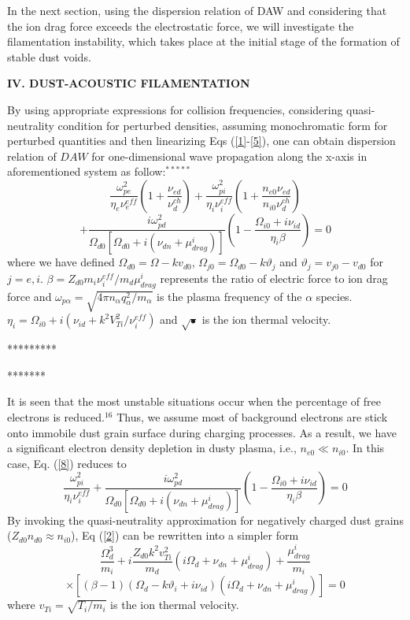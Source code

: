 In the next section, using the dispersion relation of DAW and
considering that the ion drag force exceeds the electrostatic force,
we will investigate the filamentation instability, which takes place
at the initial stage of the formation of stable dust voids.

\vskip 1cm {\bf\large IV. DUST-ACOUSTIC FILAMENTATION }\vskip 0.5cm

By using appropriate expressions for collision frequencies,
considering quasi-neutrality condition for perturbed densities,
assuming monochromatic form for perturbed quantities and  then
linearizing Eqs (\ref{1}-\ref{5}), one can obtain dispersion
relation of $DAW$ for one-dimensional wave propagation along the
x-axis in aforementioned system as follow:$^{*****}$
$$\frac{\omega_{pe}^2}{\eta_{e}\nu_{e}^{eff}}\left( 1+\frac{\nu_{ed}}{\nu_{d}^{ch}}\right)
 +\frac{\omega_{pi}^2}{\eta_{i}\nu_{i}^{eff}}\left( 1+\frac{n_{e0}\nu_{ed}}{n_{i0}\nu_{d}^{ch}}\right)$$
\begin{equation}\label{8}
+\frac{i\omega_{pd}^{2}}{\Omega_{d0}[\Omega_{d0}+i(\nu_{dn}+\mu_{drag}^i)]}\left( 1-\frac{\Omega_{i0}+
i\nu_{id}}{\eta_{i}\beta}\right) =0
\end{equation}
where we have defined $\Omega_{d0}=\Omega-k v_{d0}$,
$\Omega_{j0}=\Omega_{d0}-k\vartheta_{j}$ and
$\vartheta_{j}=v_{j0}-v_{d0}$ for $j = e, i$.
$\beta=Z_{d0}m_{i}\nu_{i}^{eff}/m_{d}\mu_{drag}^{i}$ represents the
ratio of electric force to ion drag force and
$\omega_{p\alpha}=\sqrt{4\pi n_{\alpha}q_{\alpha}^2/m_{\alpha}}$ is
the plasma frequency of the $\alpha$ species.
$\eta_{i}=\Omega_{i0}+i\left(\nu_{id}+k^2V_{Ti}^{2}/\nu_{i}^{eff}\right)$
and $\sqrt{•}$ is the ion thermal velocity.

*********

*******

It is seen that the most unstable situations occur when the
percentage of free electrons is reduced.$^{16}$ Thus, we assume most
of background electrons are stick onto immobile dust grain surface
during charging processes. As a result, we have a significant
electron density depletion in dusty plasma, i.e., $n_{e0}\ll
n_{i0}$. In this case, Eq. (\ref{8}) reduces to
\begin{equation}\label{9}
\frac{\omega_{pi}^2}{\eta_{i}\nu_{i}^{eff}}+\frac{i\omega_{pd}^{2}}{\Omega_{d0}[\Omega_{d0}
+i(\nu_{dn}+\mu_{drag}^i)]}\left( 1-\frac{\Omega_{i0}+i\nu_{id}}{\eta_{i}\beta}\right) =0
\end{equation}
By invoking the quasi-neutrality approximation for negatively
charged dust grains ($Z_{d0}n_{d0}\approx n_{i0}$), Eq (\ref{2}) can
be rewritten into a simpler form
$$\frac{\Omega_{d}^3}{m_{i}}+i\frac{Z_{d0}k^{2}v_{Ti}^{2}}{m_{d}}\left( i\Omega_{d}
+\nu_{dn}+\mu_{drag}^{i}\right)+\frac{\mu_{drag}^i}{m_{i}} $$
\begin{equation}\label{10}
\times\left[ (\beta-1)(\Omega_{d}-k\vartheta_{i}+i\nu_{id})(i\Omega_{d}+\nu_{dn}+\mu_{drag}^{i})\right]=0
\end{equation}
where $v_{Ti}= \sqrt{T_{i}/m_{i}}$ is the ion thermal velocity.

